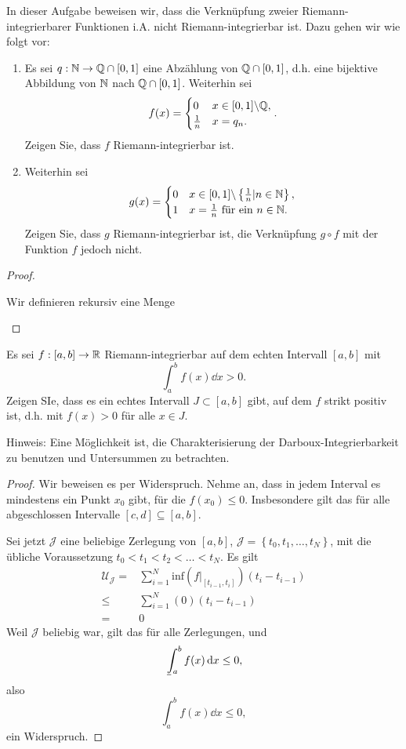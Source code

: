 \begin{Problem}
	In dieser Aufgabe beweisen wir, dass die Verknüpfung zweier Riemann-integrierbarer Funktionen i.A. nicht Riemann-integrierbar ist. Dazu gehen wir wie folgt vor:
	\begin{enumerate}[label=(\alph*)]
		\item Es sei $q:\mathbb{N} \to \mathbb{Q}\cap [0,1]$ eine Abzählung von $\mathbb{Q}\cap [0,1]$, d.h. eine bijektive Abbildung von $\mathbb{N}$ nach $\mathbb{Q}\cap [0,1]$. Weiterhin sei
			 \[
			f(x)=\begin{cases}
				0 & x\in [0,1]\backslash \mathbb{Q}, \\
				\frac{1}{n} & x=q_n.
			\end{cases}
			.\] 
			Zeigen Sie, dass $f$ Riemann-integrierbar ist.
		\item Weiterhin sei
			\[
			g(x)=\begin{cases}
				0 & x\in [0,1]\backslash \left\{ \frac{1}{n}|n\in \mathbb{N} \right\},\\
				1 & x=\frac{1}{n}\text{ f\"{u}r ein }n\in \mathbb{N}.
			\end{cases}
			\] 
			Zeigen Sie, dass $g$ Riemann-integrierbar ist, die Verknüpfung $g\circ f$ mit der Funktion $f$ jedoch nicht. 
	\end{enumerate}
\end{Problem}
\begin{proof}
	\begin{parts}
	\item Wir definieren rekursiv eine Menge
	\end{parts}
\end{proof}
\begin{Problem}
	Es sei $f:[a,b]\to \mathbb{R}$ Riemann-integrierbar auf dem echten Intervall $[a,b]$ mit
	\[
		\int_a^b f(x)\dd{x}>0
	.\] 
	Zeigen SIe, dass es ein echtes Intervall $J\subset [a,b]$ gibt, auf dem $f$ strikt positiv ist, d.h. mit $f(x)>0$ f\"{u}r alle $x\in J$.

	{\footnotesize Hinweis: Eine Möglichkeit ist, die Charakterisierung der Darboux-Integrierbarkeit zu benutzen und Untersummen zu betrachten.}
\end{Problem}
\begin{proof}
	Wir beweisen es per Widerspruch. Nehme an, dass in jedem Interval es mindestens ein Punkt $x_0$ gibt, f\"{u}r die $f(x_0)\le 0$. Insbesondere gilt das f\"{u}r alle abgeschlossen Intervalle $[c,d]\subseteq [a,b]$.

	Sei jetzt $\mathcal{J}$ eine beliebige Zerlegung von $[a,b]$, $\mathcal{J}=\left\{ t_0,t_1,\dots,t_N \right\} $, mit die übliche Voraussetzung $t_0< t_1 < t_2<\dots< t_N$. Es gilt
	\begin{align*}
		\mathcal{U}_{\mathcal{J}}=&\sum_{i=1}^{N} \text{inf}\left( f|_{[t_{i-1},t_i]} \right) (t_i-t_{i-1})\\
		\le& \sum_{i=1}^{N} (0)(t_i-t_{i-1})\\
		=& 0
	\end{align*}
	Weil $\mathcal{J}$ beliebig war, gilt das f\"{u}r alle Zerlegungen, und
	\[
		\mkern3mu\underline{\vphantom{\intop}\mkern7mu}\mkern-10mu\int_a^b f(x)\dd{x}\le 0
	,\]
	also
	\[
		\int_a^b f(x)\dd{x}\le 0
	,\] 
	ein Widerspruch.
\end{proof}
